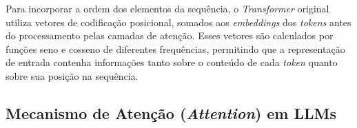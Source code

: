 Para incorporar a ordem dos elementos da sequência, o \textit{Transformer} original utiliza vetores de codificação posicional, somados aos \textit{embeddings} dos \textit{tokens} antes do processamento pelas camadas de atenção. Esses vetores são calculados por funções seno e cosseno de diferentes frequências, permitindo que a representação de entrada contenha informações tanto sobre o conteúdo de cada \textit{token} quanto sobre sua posição na sequência.






\subsection{Mecanismo de Atenção (\textit{Attention}) em LLMs}

